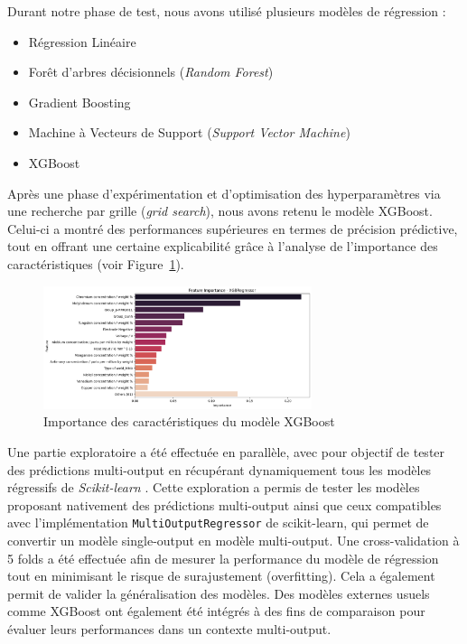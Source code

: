 \documentclass{article}
\newcommand{\bcite}[1]{\textbf{\cite{#1}}}
\begin{document}
Durant notre phase de test, nous avons utilisé plusieurs modèles de régression :

\begin{itemize}
\item Régression Linéaire
\item Forêt d’arbres décisionnels (\textit{Random Forest})
\item Gradient Boosting
\item Machine à Vecteurs de Support (\textit{Support Vector Machine})
\item XGBoost
\end{itemize}

Après une phase d’expérimentation et d’optimisation des hyperparamètres via une recherche par grille (\textit{grid search}), nous avons retenu le modèle XGBoost. Celui-ci a montré des performances supérieures en termes de précision prédictive, tout en offrant une certaine explicabilité grâce à l’analyse de l’importance des caractéristiques (voir Figure~\ref{fig:xgboost_feature_importance}).

\begin{figure}[H]
    \centering
    \includegraphics[width=0.7\textwidth]{images/xgboost_feature_importance.png}
    \caption{Importance des caractéristiques du modèle XGBoost}
    \label{fig:xgboost_feature_importance}
\end{figure}

Une partie exploratoire a été effectuée en parallèle, avec pour objectif de tester des prédictions multi-output en récupérant dynamiquement tous les modèles régressifs de \textit{Scikit-learn} \bcite{scikit-learn}. Cette exploration a permis de tester les modèles proposant nativement des prédictions multi-output ainsi que ceux compatibles avec l’implémentation \texttt{MultiOutputRegressor} de scikit-learn, qui permet de convertir un modèle single-output en modèle multi-output. Une cross-validation à 5 folds a été effectuée afin de mesurer la performance du modèle de régression tout en minimisant le risque de surajustement (overfitting). Cela a également permit de valider la généralisation des modèles. Des modèles externes usuels comme XGBoost ont également été intégrés à des fins de comparaison pour évaluer leurs performances dans un contexte multi-output. 
\end{document}
